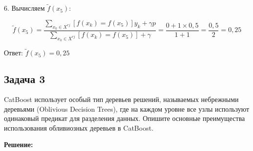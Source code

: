 6. Вычисляем $\tilde{f}(x_5)$:

$$
    \tilde{f}(x_5) = \dfrac{\sum\limits_{x_k \in X^{rj}} [f(x_k) = f(x_5)] y_k + \gamma p}{\sum\limits_{x_k \in X^{rj}} [f(x_k) = f(x_5)] + \gamma} = \dfrac{0 + 1 \times 0{,}5}{1 + 1} = \dfrac{0{,}5}{2} = 0{,}25
$$

Ответ: $\tilde{f}(x_5) = 0{,}25$

\subsection*{Задача 3}

CatBoost использует особый тип деревьев решений, называемых небрежными деревьями (Oblivious Decision Trees), где на каждом уровне все узлы используют одинаковый предикат для разделения данных. Опишите основные преимущества использования обливиозных деревьев в CatBoost.

\textbf{Решение:}


